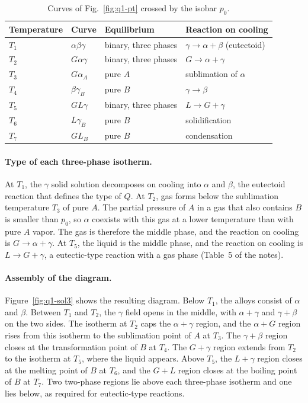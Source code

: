 \documentclass[11pt]{article}      %
\numberwithin{equation}{section}   %
\newcommand{\figref}[1]{Fig.~\ref{#1}}
\begin{document}
\begin{table}[htbp]
\centering
\caption{Curves of \figref{fig:q1-pt} crossed by the isobar $p_0$.}
\label{tab:q1-cross}
\renewcommand{\arraystretch}{1.25}
\begin{tabular}{llll}
    \hline
    Temperature & Curve & Equilibrium & Reaction on cooling \\
    \hline
    $T_1$ & $\alpha\beta\gamma$ & binary, three phases & $\gamma \to \alpha + \beta$ (eutectoid) \\
    $T_2$ & $G\alpha\gamma$ & binary, three phases & $G \to \alpha + \gamma$ \\
    $T_3$ & $G\alpha_A$ & pure $A$ & sublimation of $\alpha$ \\
    $T_4$ & $\beta\gamma_B$ & pure $B$ & $\gamma \to \beta$ \\
    $T_5$ & $GL\gamma$ & binary, three phases & $L \to G + \gamma$ \\
    $T_6$ & $L\gamma_B$ & pure $B$ & solidification \\
    $T_7$ & $GL_B$ & pure $B$ & condensation \\
    \hline
\end{tabular}
\end{table}

\paragraph{Type of each three-phase isotherm.}
At $T_1$, the $\gamma$ solid solution decomposes on cooling into $\alpha$ and $\beta$, the eutectoid reaction that defines the type of $Q$.
At $T_2$, gas forms below the sublimation temperature $T_3$ of pure $A$.
The partial pressure of $A$ in a gas that also contains $B$ is smaller than $p_0$, so $\alpha$ coexists with this gas at a lower temperature than with pure $A$ vapor.
The gas is therefore the middle phase, and the reaction on cooling is $G \to \alpha + \gamma$.
At $T_5$, the liquid is the middle phase, and the reaction on cooling is $L \to G + \gamma$, a eutectic-type reaction with a gas phase (Table~5 of the notes).

\paragraph{Assembly of the diagram.}
Figure~\ref{fig:q1-sol3} shows the resulting diagram.
Below $T_1$, the alloys consist of $\alpha$ and $\beta$.
Between $T_1$ and $T_2$, the $\gamma$ field opens in the middle, with $\alpha + \gamma$ and $\gamma + \beta$ on the two sides.
The isotherm at $T_2$ caps the $\alpha + \gamma$ region, and the $\alpha + G$ region rises from this isotherm to the sublimation point of $A$ at $T_3$.
The $\gamma + \beta$ region closes at the transformation point of $B$ at $T_4$.
The $G + \gamma$ region extends from $T_2$ to the isotherm at $T_5$, where the liquid appears.
Above $T_5$, the $L + \gamma$ region closes at the melting point of $B$ at $T_6$, and the $G + L$ region closes at the boiling point of $B$ at $T_7$.
Two two-phase regions lie above each three-phase isotherm and one lies below, as required for eutectic-type reactions.
\end{document}

